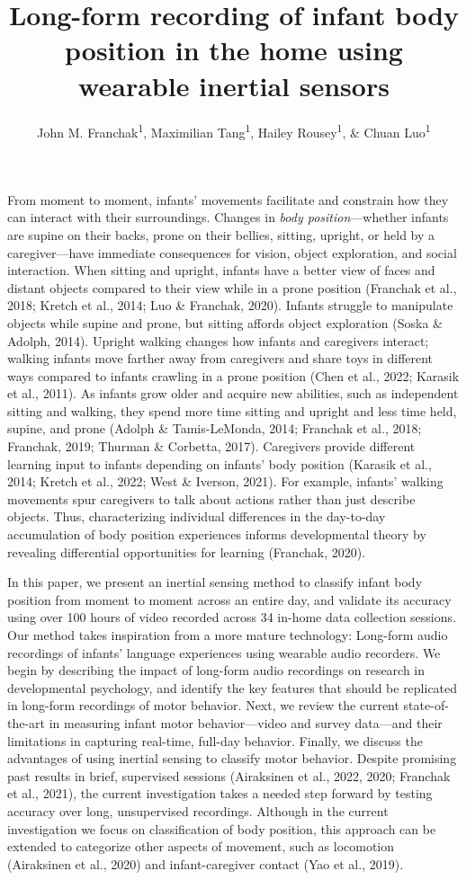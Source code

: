 \documentclass[
  man]{apa6}
\title{Long-form recording of infant body position in the home using wearable inertial sensors}
\author{John M. Franchak\textsuperscript{1}, Maximilian Tang\textsuperscript{1}, Hailey Rousey\textsuperscript{1}, \& Chuan Luo\textsuperscript{1}}
\date{}
\affiliation{\phantom{0}}
\begin{document}
\maketitle

From moment to moment, infants' movements facilitate and constrain how they can interact with their surroundings. Changes in \emph{body position}---whether infants are supine on their backs, prone on their bellies, sitting, upright, or held by a caregiver---have immediate consequences for vision, object exploration, and social interaction. When sitting and upright, infants have a better view of faces and distant objects compared to their view while in a prone position (Franchak et al., 2018; Kretch et al., 2014; Luo \& Franchak, 2020). Infants struggle to manipulate objects while supine and prone, but sitting affords object exploration (Soska \& Adolph, 2014). Upright walking changes how infants and caregivers interact; walking infants move farther away from caregivers and share toys in different ways compared to infants crawling in a prone position (Chen et al., 2022; Karasik et al., 2011). As infants grow older and acquire new abilities, such as independent sitting and walking, they spend more time sitting and upright and less time held, supine, and prone (Adolph \& Tamis-LeMonda, 2014; Franchak et al., 2018; Franchak, 2019; Thurman \& Corbetta, 2017). Caregivers provide different learning input to infants depending on infants' body position (Karasik et al., 2014; Kretch et al., 2022; West \& Iverson, 2021). For example, infants' walking movements spur caregivers to talk about actions rather than just describe objects. Thus, characterizing individual differences in the day-to-day accumulation of body position experiences informs developmental theory by revealing differential opportunities for learning (Franchak, 2020).

In this paper, we present an inertial sensing method to classify infant body position from moment to moment across an entire day, and validate its accuracy using over 100 hours of video recorded across 34 in-home data collection sessions. Our method takes inspiration from a more mature technology: Long-form audio recordings of infants' language experiences using wearable audio recorders. We begin by describing the impact of long-form audio recordings on research in developmental psychology, and identify the key features that should be replicated in long-form recordings of motor behavior. Next, we review the current state-of-the-art in measuring infant motor behavior---video and survey data---and their limitations in capturing real-time, full-day behavior. Finally, we discuss the advantages of using inertial sensing to classify motor behavior. Despite promising past results in brief, supervised sessions (Airaksinen et al., 2022, 2020; Franchak et al., 2021), the current investigation takes a needed step forward by testing accuracy over long, unsupervised recordings. Although in the current investigation we focus on classification of body position, this approach can be extended to categorize other aspects of movement, such as locomotion (Airaksinen et al., 2020) and infant-caregiver contact (Yao et al., 2019).
\end{document}
